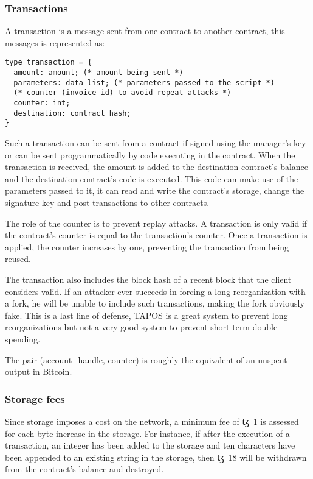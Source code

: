 \documentclass[letterpaper]{article}
\newcommand{\tz}{{\fontspec{DejaVu Sans} \small{ꜩ}}}
\begin{document}
\subsubsection{Transactions}

A transaction is a message sent from one contract to another contract, this
messages is represented as:

\begin{lstlisting}
type transaction = {
  amount: amount; (* amount being sent *)
  parameters: data list; (* parameters passed to the script *)
  (* counter (invoice id) to avoid repeat attacks *)
  counter: int;
  destination: contract hash;
}
\end{lstlisting}

Such a transaction can be sent from a contract if signed using the manager's key
or can be sent programmatically by code executing in the contract. When the
transaction is received, the amount is added to the destination contract's
balance and the destination contract's code is executed. This code can make use
of the parameters passed to it, it can read and write the contract's storage,
change the signature key and post transactions to other contracts.

The role of the counter is to prevent replay attacks. A transaction is only
valid if the contract's counter is equal to the transaction's counter. Once a
transaction is applied, the counter increases by one, preventing the transaction
from being reused.

The transaction also includes the block hash of a recent block that the client
considers valid. If an attacker ever succeeds in forcing a long reorganization
with a fork, he will be unable to include such transactions, making the fork
obviously fake. This is a last line of defense, TAPOS is a great system to
prevent long reorganizations but not a very good system to prevent short term
double spending.

The pair (account\_handle, counter) is roughly the equivalent of an unspent
output in Bitcoin.

\subsubsection{Storage fees}

Since storage imposes a cost on the network, a minimum fee of \tz~1 is assessed
for each byte increase in the storage. For instance, if after the execution of
a transaction, an integer has been added to the storage and ten characters have
been appended to an existing string in the storage, then \tz~18 will be withdrawn
from the contract's balance and destroyed. 
\end{document}
